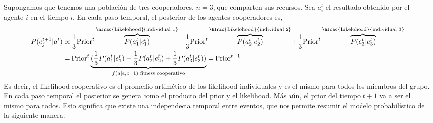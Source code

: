 \documentclass[a4paper,10pt]{article}
\begin{document}
Supongamos que tenemos una población de tres cooperadores, $n=3$, que comparten sus recursos.
Sea $a_i^t$ el resultado obtenido por el agente $i$ en el tiempo $t$.
En cada paso temporal, el posterior de los agentes cooperadores es,
\begin{equation}
\begin{split}
P(e_j^{t+1}|a^t) &\propto \frac{1}{3} \text{Prior}^t  \overbrace{P(a_1^t|e_1^t)}^{\hfrac{\text{Likelohood}}{\text{individual 1}}} + \frac{1}{3} \text{Prior}^t  \overbrace{P(a_2^t|e_2^t)}^{\hfrac{\text{Likelohood}}{\text{individual 2}}}  + \frac{1}{3} \text{Prior}^t  \overbrace{P(a_3^t|e_3^t)}^{\hfrac{\text{Likelohood}}{\text{individual 3}}}  \\
&= \text{Prior}^t \underbrace{(\frac{1}{3} P(a_1^t|e_1^t) + \frac{1}{3} P(a_2^t|e_2^t) + \frac{1}{3} P(a_3^t|e_3^t))}_{f(a|e,c=1)\text{ fitness cooperativo}} = \text{Prior}^{t+1}
\end{split}
\end{equation}
%
Es decir, el likelihood cooperativo es el promedio artimético de los likelihood individuales y es el mismo para todos los miembros del grupo.
En cada paso temporal el posterior se genera como el producto del prior y el likelihood.
Más aún, el prior del tiempo $t+1$ va a ser el mismo para todos.
Esto significa que existe una independecia temporal entre eventos, que nos permite resumir el modelo probabilístico de la siguiente manera.
%     
%     
%     
%     
\end{document}
